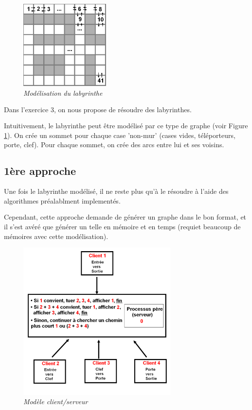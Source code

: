 \documentclass[10pt]{article}
\begin{document}
		\begin{figure}
			\includegraphics[width=4.5cm]{./images/lab.png}
			\caption{\textit{Modélisation du labyrinthe}}
			\label{modelisationlab}
		\end{figure}
		
		Dans l'exercice 3, on nous propose de résoudre des labyrinthes.\newline
		
		Intuitivement, le labyrinthe peut être modélisé par ce type de graphe (voir Figure \ref{modelisationlab}).
		On crée un sommet pour chaque case 'non-mur' (cases vides, téléporteurs, porte, clef).
		Pour chaque sommet, on crée des arcs entre lui et ses voisins.\newline
			
		\subsection{1ère approche} \label{first_approach}
			Une fois le labyrinthe modélisé, il ne reste plus qu'à le résoudre à l'aide des algorithmes préalablment implementés.\newline
			
			Cependant, cette approche demande de générer un graphe dans le bon format, et il s'est avéré que générer un telle
			en mémoire et en temps (requiet beaucoup de mémoires avec cette modélisation).

		\begin{figure}
			\includegraphics[width=8.0cm]{./images/exo3.png}
			\caption{\textit{Modèle client/serveur}}
			\label{exo3}
		\end{figure}
\end{document}

